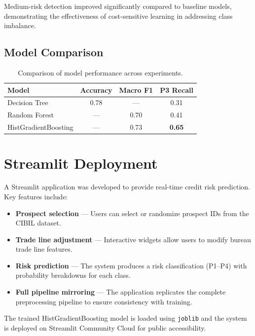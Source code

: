 \documentclass[12pt,a4paper]{article}
\begin{document}
\noindent Medium-risk detection improved significantly compared to baseline models, demonstrating the effectiveness of cost-sensitive learning in addressing class imbalance.

\subsection{Model Comparison}

\begin{table}[h!]
    \centering
    \begin{tabular}{@{} l c c c @{}}
        \toprule
        \textbf{Model} & \textbf{Accuracy} & \textbf{Macro F1} & \textbf{P3 Recall} \\
        \midrule
        Decision Tree          & 0.78 & ---  & 0.31 \\
        Random Forest          & ---  & 0.70 & 0.41 \\
        HistGradientBoosting   & ---  & 0.73 & \textbf{0.65} \\
        \bottomrule
    \end{tabular}
    \caption{Comparison of model performance across experiments.}
    \label{tab:comparison}
\end{table}

\section{Streamlit Deployment}

A Streamlit application was developed to provide real-time credit risk prediction. Key features include:

\begin{itemize}[nosep]
    \item \textbf{Prospect selection} --- Users can select or randomize prospect IDs from the CIBIL dataset.
    \item \textbf{Trade line adjustment} --- Interactive widgets allow users to modify bureau trade line features.
    \item \textbf{Risk prediction} --- The system produces a risk classification (P1--P4) with probability breakdowns for each class.
    \item \textbf{Full pipeline mirroring} --- The application replicates the complete preprocessing pipeline to ensure consistency with training.
\end{itemize}

\noindent The trained HistGradientBoosting model is loaded using \texttt{joblib} and the system is deployed on Streamlit Community Cloud for public accessibility.
\end{document}
